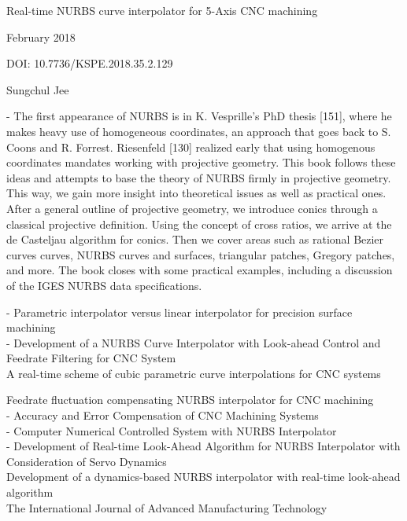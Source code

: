\begin{tcolorbox}

Real-time NURBS curve interpolator for 5-Axis CNC machining

February 2018

DOI: 10.7736/KSPE.2018.35.2.129

Sungchul Jee


\cite{FarinBook_1999} - The first appearance of NURBS is in K. Vesprille's PhD thesis [151],
where he makes heavy use of homogeneous coordinates, an approach that
goes back to S. Coons and R. Forrest. Riesenfeld [130] realized early that
using homogenous coordinates mandates working with projective geometry. This book follows these ideas and attempts to base the theory of NURBS firmly in projective geometry. This way, we gain more insight into
theoretical issues as well as practical ones. After a general outline of projective geometry, we introduce conics
through a classical projective definition. Using the concept of cross ratios, we arrive at the de Casteljau algorithm for conics. Then we cover areas such as rational Bezier curves curves, NURBS curves and surfaces, triangular patches, Gregory patches, and more. The book closes with some practical examples, including a discussion of the IGES NURBS data specifications.

\cite{Yang_1994} - Parametric interpolator versus linear interpolator for precision surface machining\\
\cite{Zhang_2009} - Development of a NURBS Curve Interpolator with Look-ahead Control and Feedrate Filtering for CNC System\\
\cite{Bahr_2001} A real-time scheme of cubic parametric curve interpolations for CNC systems

\cite{Cho_2017} Feedrate fluctuation compensating NURBS interpolator for CNC machining\\

\cite{ErrorBook_2016} - Accuracy and Error Compensation of CNC Machining Systems\\
\cite{Liangji_2009} - Computer Numerical Controlled System with NURBS Interpolator\\
\cite{Lin_2007-02} - Development of Real-time Look-Ahead Algorithm for NURBS Interpolator with Consideration of Servo Dynamics\\
\cite{Lin_2007-01}	Development of a dynamics-based NURBS interpolator with real-time look-ahead algorithm\\

The International Journal of Advanced Manufacturing Technology


\end{tcolorbox}
